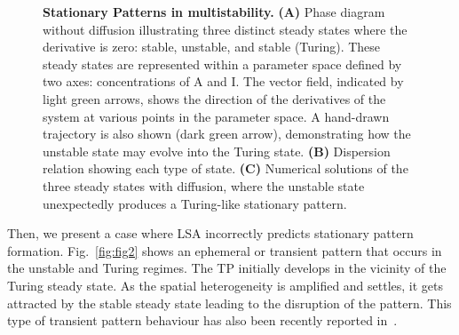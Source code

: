\documentclass[10pt,letterpaper]{article}
\begin{document}
\begin{figure}[!h]
    \caption{{\bf Stationary Patterns in multistability.} \textbf{(A)} Phase diagram without diffusion illustrating three distinct steady states where the derivative is zero: stable, unstable, and stable (Turing). These steady states are represented within a parameter space defined by two axes: concentrations of A and I. The vector field, indicated by light green arrows, shows the direction of the derivatives of the system at various points in the parameter space. A hand-drawn trajectory is also shown (dark green arrow), demonstrating how the unstable state may evolve into the Turing state. \textbf{(B)} Dispersion relation showing each type of state. \textbf{(C)} Numerical solutions of the three steady states with diffusion, where the unstable state unexpectedly produces a Turing-like stationary pattern.}
    \label{fig2}
\end{figure}


Then, we present a case where LSA incorrectly predicts stationary pattern formation.
Fig.~\ref{fig:fig2} shows an ephemeral or transient pattern that occurs in the unstable and Turing regimes.
The TP initially develops in the vicinity of the Turing steady state.
As the spatial heterogeneity is amplified and settles, it gets attracted by the stable steady state leading to the disruption of the pattern.
This type of transient pattern behaviour has also been recently reported in~\cite{Krause2023}.
\end{document}
